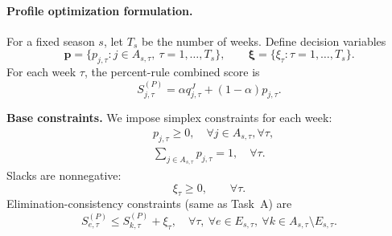 \paragraph{Profile optimization formulation.}
\label{para:kpi2_profile_formulation}

For a fixed season $s$, let $T_s$ be the number of weeks.
Define decision variables
\[
\mathbf{p}=\{p_{j,\tau}: j\in A_{s,\tau},\ \tau=1,\dots,T_s\},\qquad
\boldsymbol{\xi}=\{\xi_\tau:\tau=1,\dots,T_s\}.
\]
For each week $\tau$, the percent-rule combined score is
\[
S^{(P)}_{j,\tau}=\alpha q^J_{j,\tau}+(1-\alpha)p_{j,\tau}.
\]

\textbf{Base constraints.}
We impose simplex constraints for each week:\cite{aitchison1986compositional,pawlowsky2015compositional}
\begin{align}
& p_{j,\tau}\ge 0,\quad \forall j\in A_{s,\tau}, \forall \tau, \label{eq:kpi2_nonneg}\\
& \sum_{j\in A_{s,\tau}}p_{j,\tau}=1,\quad \forall \tau. \label{eq:kpi2_simplex}
\end{align}
Slacks are nonnegative:
\begin{equation}
\xi_\tau\ge 0,\qquad \forall \tau. \label{eq:kpi2_slack_nonneg}
\end{equation}
Elimination-consistency constraints (same as Task~A) are
\begin{equation}
S^{(P)}_{e,\tau}\le S^{(P)}_{k,\tau}+\xi_\tau,\quad \forall \tau,\ \forall e\in E_{s,\tau},\ \forall k\in A_{s,\tau}\setminus E_{s,\tau}.
\label{eq:kpi2_elim}
\end{equation}

